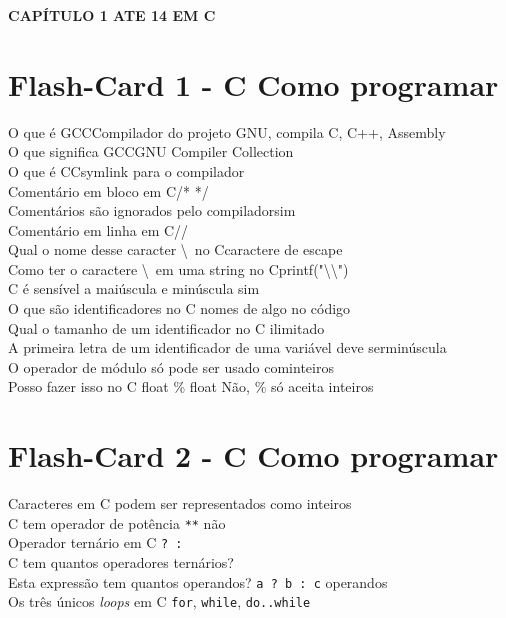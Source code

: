 \documentclass[a4paper,12pt]{article}
\begin{document}
\begin{center}
    \colorbox{blue!30}{\Large\textbf{CAPÍTULO 1 ATE 14 EM C}}
\end{center}

\section*{Flash-Card 1 - C Como programar}
O que é  GCC\dotfill Compilador do projeto GNU, compila C, C++, Assembly\\
O que significa GCC\dotfill GNU Compiler Collection\\
O que é  CC\dotfill symlink para o compilador\\
Comentário em bloco em C\dotfill /* */  \\
Comentários são ignorados pelo compilador\dotfill sim\\
Comentário em linha em C\dotfill //\\
Qual o nome desse caracter \textbackslash\, no C\dotfill caractere de escape\\
Como ter o caractere \textbackslash\ em uma string no C\dotfill printf("\textbackslash\textbackslash")\\
C é sensível a maiúscula e minúscula \dotfill sim\\
O que são identificadores no C \dotfill nomes de algo no código\\
Qual o tamanho de um identificador no C \dotfill ilimitado\\
A primeira letra de um identificador de uma variável deve ser\dotfill minúscula\\
O operador de módulo só pode ser usado com\dotfill inteiros\\
Posso fazer isso no C  float \% float \dotfill Não, \% só aceita inteiros\\

\section*{Flash-Card 2 - C Como programar}
Caracteres em C podem ser representados como \dotfill inteiros\\
C tem operador de potência \verb|**| \dotfill não\\
Operador ternário em C \dotfill \verb|? :|\\
C tem quantos operadores ternários? \\
Esta expressão tem quantos operandos? \verb|a ? b : c|  operandos\\
Os três únicos \textit{loops} em C \dotfill \verb|for|, \verb|while|, \verb|do..while|\\
\end{document}

